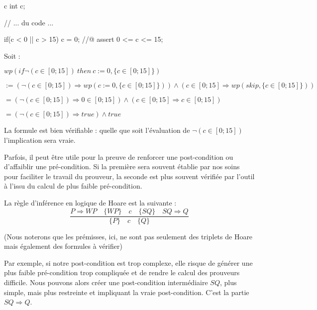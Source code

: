 \begin{CodeBlock}{c}
int c;

// ... du code ...

if(c < 0 || c > 15){
  c = 0;
}
//@ assert 0 <= c <= 15;
\end{CodeBlock}



Soit :



$wp(if \neg (c \in [0;15])\ then\ c := 0, \{c \in [0;15]\})$



$:= (\neg (c \in [0;15])\Rightarrow wp(c := 0, \{c \in [0;15]\})) \wedge (c \in [0;15]\Rightarrow wp(skip, \{c \in [0;15]\}))$



$= (\neg (c \in [0;15]) \Rightarrow 0 \in [0;15]) \wedge (c \in [0;15] \Rightarrow c \in [0;15])$



$= (\neg (c \in [0;15]) \Rightarrow true) \wedge true$



La formule est bien vérifiable : quelle que soit l'évaluation de $\neg (c \in [0;15])$ l'implication sera vraie.


\label{l3:statements-basic-consequence}



Parfois, il peut être utile pour la preuve de renforcer une post-condition ou 
d'affaiblir une pré-condition. Si la première sera souvent établie par nos soins
pour faciliter le travail du prouveur, la seconde est plus souvent vérifiée 
par l'outil à l'issu du calcul de plus faible pré-condition.



La règle d'inférence en logique de Hoare est la suivante :
$$\dfrac{P \Rightarrow WP \quad \{WP\}\quad c\quad \{SQ\} \quad SQ \Rightarrow Q}{\{P\}\quad c \quad \{Q\}}$$



(Nous noterons que les prémisses, ici, ne sont pas seulement des triplets de
Hoare mais également des formules à vérifier)



Par exemple, si notre post-condition est trop complexe, elle risque de générer
une plus faible pré-condition trop compliquée et de rendre le calcul des 
prouveurs difficile. Nous pouvons alors créer une post-condition intermédiaire
$SQ$, plus simple, mais plus restreinte et impliquant la vraie post-condition. 
C'est la partie $SQ \Rightarrow Q$.



